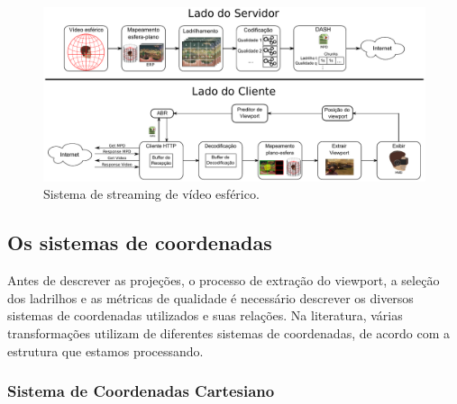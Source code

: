 \begin{figure}
	\centering
	\includegraphics[width=0.9\linewidth]{"fig/Streaming - client-side and server-side.pdf"}
	\caption{Sistema de streaming de vídeo esférico.}
	\label{fig:streaming_client_server}
\end{figure}


\subsection{Os sistemas de coordenadas}

Antes de descrever as projeções, o processo de extração do viewport, a seleção dos ladrilhos e as métricas de qualidade é necessário descrever os diversos sistemas de coordenadas utilizados e suas relações. Na literatura, várias transformações utilizam de diferentes sistemas de coordenadas, de acordo com a estrutura que estamos processando.

\subsubsection{Sistema de Coordenadas Cartesiano}

